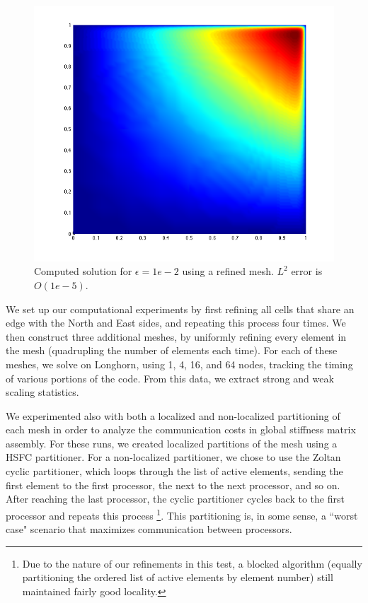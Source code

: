 \documentclass{article}
\newcommand{\oneFig}{.45}
\begin{document}
\begin{figure}[h!]
\centering
\includegraphics[scale=\oneFig]{figs/Solution12928nomesh.png}
\caption{Computed solution for $\epsilon=1e-2$ using a refined mesh.  $L^2$ error is $O(1e-5)$.}
\end{figure}

We set up our computational experiments by first refining all cells that share an edge with the North and East sides, and repeating this process four times.   We then construct three additional meshes, by uniformly refining every element in the mesh (quadrupling the number of elements each time).  For each of these meshes, we solve on Longhorn, using 1, 4, 16, and 64 nodes, tracking the timing of various portions of the code.  From this data, we extract strong and weak scaling statistics.  

We experimented also with both a localized and non-localized partitioning of each mesh in order to analyze the communication costs in global stiffness matrix assembly.  For these runs, we created localized partitions of the mesh using a HSFC partitioner.  For a non-localized partitioner, we chose to use the Zoltan cyclic partitioner, which loops through the list of active elements, sending the first element to the first processor, the next to the next processor, and so on.  After reaching the last processor, the cyclic partitioner cycles back to the first processor and repeats this process \footnote{Due to the nature of our refinements in this test, a blocked algorithm (equally partitioning the ordered list of active elements by element number) still maintained fairly good locality.}.  This partitioning is, in some sense, a ``worst case" scenario that maximizes communication between processors.  
\end{document}
